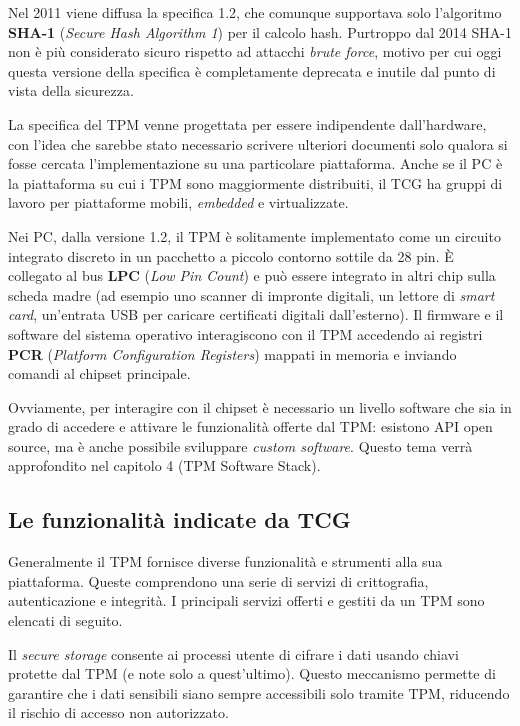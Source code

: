 Nel 2011 viene diffusa la specifica 1.2, che comunque supportava solo l’algoritmo \textbf{SHA-1} (\textit{Secure Hash Algorithm 1}) per il calcolo hash. Purtroppo dal 2014 SHA-1 non è più considerato sicuro rispetto ad attacchi \textit{brute force}, motivo per cui oggi questa versione della specifica è completamente deprecata e inutile dal punto di vista della sicurezza.

La specifica del TPM venne progettata per essere indipendente dall’hardware, con l'idea che sarebbe stato necessario scrivere ulteriori documenti solo qualora si fosse cercata l'implementazione su una particolare piattaforma. 
Anche se il PC è la piattaforma su cui i TPM sono maggiormente distribuiti, il TCG ha gruppi di lavoro per piattaforme mobili, \textit{embedded} e virtualizzate. 

Nei PC, dalla versione 1.2, il TPM è solitamente implementato come un circuito integrato discreto in un pacchetto a piccolo contorno sottile da 28 pin. È collegato al bus \textbf{LPC} (\textit{Low Pin Count}) e può essere integrato in altri chip sulla scheda madre (ad esempio uno scanner di impronte digitali, un lettore di \textit{smart card}, un’entrata USB per caricare certificati digitali dall’esterno). Il firmware e il software del sistema operativo interagiscono con il TPM accedendo ai registri \textbf{PCR} (\textit{Platform Configuration Registers}) mappati in memoria e inviando comandi al chipset principale.

Ovviamente, per interagire con il chipset è necessario un livello software che sia in grado di accedere e attivare le funzionalità offerte dal TPM: esistono API open source, ma è anche possibile sviluppare \textit{custom software}. Questo tema verrà approfondito nel capitolo 4 (TPM Software Stack).

\subsection{Le funzionalità indicate da TCG}
Generalmente il TPM fornisce diverse funzionalità e strumenti alla sua piattaforma. Queste comprendono una serie di servizi di crittografia, autenticazione e integrità. I principali servizi offerti e gestiti da un TPM sono elencati di seguito.


Il \textit{secure storage} consente ai processi utente di cifrare i dati usando chiavi protette dal TPM (e note solo a quest’ultimo). Questo meccanismo permette di garantire che i dati sensibili siano sempre accessibili solo tramite TPM, riducendo il rischio di accesso non autorizzato.

